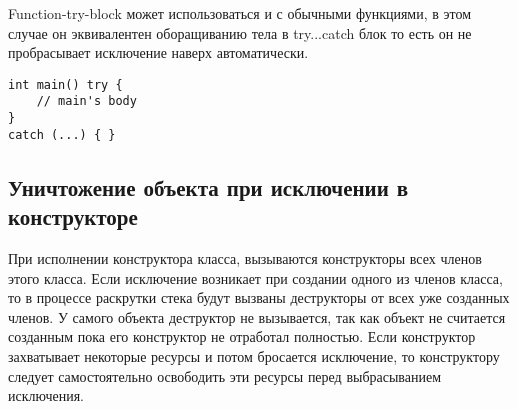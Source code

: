 Function-try-block может использоваться и с обычными функциями, в этом случае он эквивалентен оборащиванию тела в try...catch блок то есть он не пробрасывает исключение наверх автоматически.

\begin{verbatim}
int main() try {
    // main's body
}
catch (...) { }
\end{verbatim}

\subsection{Уничтожение объекта при исключении в конструкторе}

При исполнении конструктора класса, вызываются конструкторы всех членов этого класса. Если исключение возникает при создании одного из членов класса, то в процессе раскрутки стека будут вызваны деструкторы от всех уже созданных членов. У самого объекта деструктор не вызывается, так как объект не считается созданным пока его конструктор не отработал полностью. Если конструктор захватывает некоторые ресурсы и потом бросается исключение, то конструктору следует самостоятельно освободить эти ресурсы перед выбрасыванием исключения.

